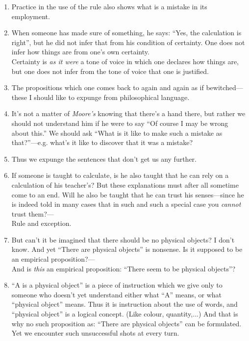 \documentclass{book}
\begin{document}
\begin{enumerate}
\item
Practice in the use of the rule also shows what is a mistake in its employment.

\item
When someone has made sure of something, he says: ``Yes, the calculation is
right'', but he did not infer that from his condition of certainty. One does
not infer how things are from one's own certainty. \\
Certainty is \emph{as it were} a tone of voice in which one declares how things
are, but one does not infer from the tone of voice that one is justified.

\item
The propositions which one comes back to again and again as if
bewitched---these I should like to expunge from philosophical language.

\item
It's not a matter of \emph{Moore's} knowing that there's a hand there, but
rather we should not understand him if he were to say ``Of course I may be
wrong about this.'' We should ask ``What is it like to make such a mistake as
that?''---e.g. what's it like to discover that it was a mistake?

\item
Thus we expunge the sentences that don't get us any further.

\item
If someone is taught to calculate, is he also taught that he can rely on a
calculation of his teacher's? But these explanations must after all sometime
come to an end. Will he also be taught that he can trust his senses---since he
is indeed told in many cases that in such and such a special case you
\emph{cannot} trust them?---\\
Rule and exception.

\item
But can't it be imagined that there should be no physical objects? I don't
know. And yet ``There are physical objects'' is nonsense. Is it supposed to be
an empirical proposition?---\\ 
And is \emph{this} an empirical proposition: ``There seem to be physical
objects''?

\item
``A is a physical object'' is a piece of instruction which we give only to
someone who doesn't yet understand either what ``A'' means, or what ``physical
object'' means. Thus it is instruction about the use of words, and ``physical
object'' is a logical concept. (Like colour, quantity,...) And that is why no
such proposition as: ``There are physical objects'' can be formulated.  Yet we
encounter such unsuccessful shots at every turn.


\end{enumerate}
\end{document}

